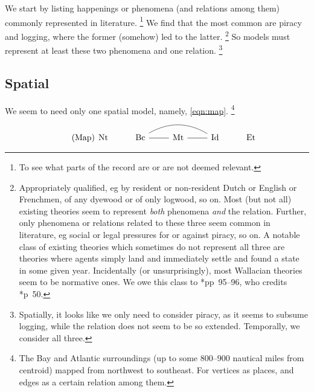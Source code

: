 	We start by listing happenings or phenomena (and relations among them) commonly represented in literature.%
	\footnote{To see what parts of the record are or are not deemed relevant.}
	We find that the most common are piracy and logging, where the former (somehow) led to the latter.%
	\footnote{Appropriately qualified, eg  by resident or non-resident Dutch or English or Frenchmen,  of any dyewood or of only logwood, so on. Most (but not all) existing theories seem to represent \emph{both} phenomena \emph{and} the relation. Further, only phenomena or relations related to these three seem common in literature, eg social or legal pressures for or against piracy, so on. A notable class of existing theories which sometimes do not represent all three are  theories where agents simply land and immediately settle and found a state in some given year. Incidentally (or unsurprisingly), most Wallacian theories seem to be normative ones. We owe this class to \cite{cam11}*{pp~95--96}, who credits \cite{luk50}*{p~50}.}
	So models must represent at least these two phenomena and one relation.%
	\footnote{Spatially, it looks like we only need to consider piracy, as it seems to subsume logging, while the relation does not seem to be so extended. Temporally, we consider all three.}
	\subsection{Spatial}
	\label{ss:spatial}
		We seem to need only one spatial model, namely, \ref{eqn:map}.%
		\footnote{The Bay and Atlantic surroundings (up to some 800--900 nautical miles from centroid) mapped from northwest to southeast. For vertices as places, and edges as a certain relation among them. }
		\begin{equation}
		\tag{Map}
		\label{eqn:map}
		\begin{tikzcd}[arrows=dash]
		\nt &\bc \rar \ar[rr,bend left] &\mt \rar &\id &\et
		\end{tikzcd}
		\end{equation}
	
